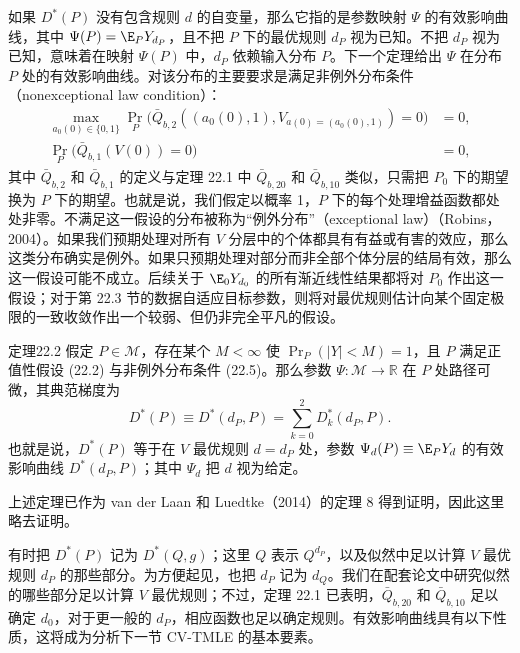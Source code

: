 如果 $D^*(P)$ 没有包含规则 $d$ 的自变量，那么它指的是参数映射 $\Psi$ 的有效影响曲线，其中 $\Psi(P)=\E_PY_{d_P}$，且不把 $P$ 下的最优规则 $d_P$ 视为已知。不把 $d_P$ 视为已知，意味着在映射 $\Psi(P)$ 中，$d_P$ 依赖输入分布 $P$。下一个定理给出 $\Psi$ 在分布 $P$ 处的有效影响曲线。对该分布的主要要求是满足非例外分布条件（nonexceptional law condition）：
\begin{equation}
\begin{aligned}
 \max_{a_0(0)\in\{0,1\}}\Pr_P\bigl(
 \bar Q_{b,2}((a_0(0),1),V_{a(0)=(a_0(0),1)})=0\bigr)&=0,\\
 \Pr_P\bigl(\bar Q_{b,1}(V(0))=0\bigr)&=0,
\end{aligned}
\tag{22.5}
\end{equation}
其中 $\bar Q_{b,2}$ 和 $\bar Q_{b,1}$ 的定义与定理 22.1 中 $\bar Q_{b,20}$ 和 $\bar Q_{b,10}$ 类似，只需把 $P_0$ 下的期望换为 $P$ 下的期望。也就是说，我们假定以概率 1，$P$ 下的每个处理增益函数都处处非零。不满足这一假设的分布被称为“例外分布”（exceptional law）（Robins，2004）。如果我们预期处理对所有 $V$ 分层中的个体都具有有益或有害的效应，那么这类分布确实是例外。如果只预期处理对部分而非全部个体分层的结局有效，那么这一假设可能不成立。后续关于 $\E_0Y_{d_0}$ 的所有渐近线性结果都将对 $P_0$ 作出这一假设；对于第 22.3 节的数据自适应目标参数，则将对最优规则估计向某个固定极限的一致收敛作出一个较弱、但仍非完全平凡的假设。

\begin{bookresult}{定理}{22.2}
假定 $P\in\mathcal M$，存在某个 $M<\infty$ 使 $\Pr_P(|Y|<M)=1$，且 $P$ 满足正值性假设 (22.2) 与非例外分布条件 (22.5)。那么参数 $\Psi:\mathcal M\to\mathbb R$ 在 $P$ 处路径可微，其典范梯度为
\[
 D^*(P)\equiv D^*(d_P,P)=\sum_{k=0}^2D_k^*(d_P,P).
\]
也就是说，$D^*(P)$ 等于在 $V$ 最优规则 $d=d_P$ 处，参数 $\Psi_d(P)\equiv\E_PY_d$ 的有效影响曲线 $D^*(d_P,P)$；其中 $\Psi_d$ 把 $d$ 视为给定。
\end{bookresult}

上述定理已作为 van der Laan 和 Luedtke（2014）的定理 8 得到证明，因此这里略去证明。

有时把 $D^*(P)$ 记为 $D^*(Q,g)$；这里 $Q$ 表示 $Q^{d_P}$，以及似然中足以计算 $V$ 最优规则 $d_P$ 的那些部分。为方便起见，也把 $d_P$ 记为 $d_Q$。我们在配套论文中研究似然的哪些部分足以计算 $V$ 最优规则；不过，定理 22.1 已表明，$\bar Q_{b,20}$ 和 $\bar Q_{b,10}$ 足以确定 $d_0$，对于更一般的 $d_P$，相应函数也足以确定规则。有效影响曲线具有以下性质，这将成为分析下一节 CV-TMLE 的基本要素。

